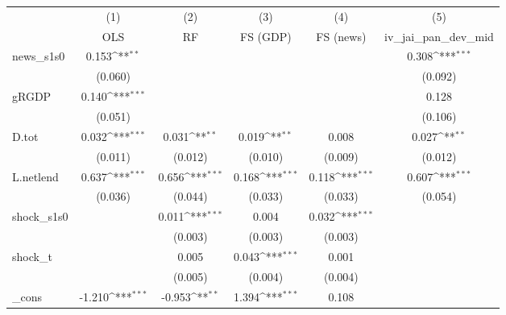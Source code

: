 {
\def\sym#1{\ifmmode^{#1}\else\(^{#1}\)\fi}
\begin{tabular}{l*{5}{c}}
\toprule
            &\multicolumn{1}{c}{(1)}&\multicolumn{1}{c}{(2)}&\multicolumn{1}{c}{(3)}&\multicolumn{1}{c}{(4)}&\multicolumn{1}{c}{(5)}\\
            &\multicolumn{1}{c}{OLS}&\multicolumn{1}{c}{RF}&\multicolumn{1}{c}{FS (GDP)}&\multicolumn{1}{c}{FS (news)}&\multicolumn{1}{c}{iv\_jai\_pan\_dev\_mid}\\
\midrule
news\_s1s0   &       0.153\sym{**} &                     &                     &                     &       0.308\sym{***}\\
            &     (0.060)         &                     &                     &                     &     (0.092)         \\
\addlinespace
gRGDP       &       0.140\sym{***}&                     &                     &                     &       0.128         \\
            &     (0.051)         &                     &                     &                     &     (0.106)         \\
\addlinespace
D.tot       &       0.032\sym{***}&       0.031\sym{**} &       0.019\sym{**} &       0.008         &       0.027\sym{**} \\
            &     (0.011)         &     (0.012)         &     (0.010)         &     (0.009)         &     (0.012)         \\
\addlinespace
L.netlend   &       0.637\sym{***}&       0.656\sym{***}&       0.168\sym{***}&       0.118\sym{***}&       0.607\sym{***}\\
            &     (0.036)         &     (0.044)         &     (0.033)         &     (0.033)         &     (0.054)         \\
\addlinespace
shock\_s1s0  &                     &       0.011\sym{***}&       0.004         &       0.032\sym{***}&                     \\
            &                     &     (0.003)         &     (0.003)         &     (0.003)         &                     \\
\addlinespace
shock\_t     &                     &       0.005         &       0.043\sym{***}&       0.001         &                     \\
            &                     &     (0.005)         &     (0.004)         &     (0.004)         &                     \\
\addlinespace
\_cons      &      -1.210\sym{***}&      -0.953\sym{**} &       1.394\sym{***}&       0.108         &                     \\

\end{tabular}}
